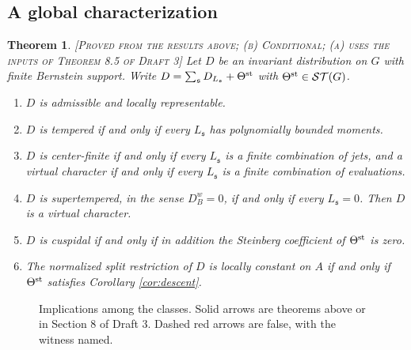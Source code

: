 \documentclass[12pt,letterpaper]{amsart}
\numberwithin{equation}{section}
\newtheorem{theorem}{Theorem}[section]
\theoremstyle{definition}
\theoremstyle{remark}
\newcommand{\St}{\mathrm{St}}
\newcommand{\triv}{\mathbf 1}
\newcommand{\ST}{\mathcal{ST}}
\newcommand{\status}[1]{\textup{[\textsc{#1}]}}
\begin{document}
\subsection{A global characterization}\label{sub:global}
\begin{theorem}\label{thm:global}\status{Proved from the results above; (b) Conditional; (a) uses the inputs of Theorem 8.5 of Draft 3}
Let $D$ be an invariant distribution on $G$ with finite Bernstein support. Write $D=\sum_{\mathfrak s}D_{L_{\mathfrak s}}+\Theta^{\rm st}$ with $\Theta^{\rm st}\in\ST(G)$.
\begin{enumerate}[label=(\alph*),leftmargin=*]
\item $D$ is admissible and locally representable.
\item $D$ is tempered if and only if every $L_{\mathfrak s}$ has polynomially bounded moments.
\item $D$ is center-finite if and only if every $L_{\mathfrak s}$ is a finite combination of jets, and a virtual character if and only if every $L_{\mathfrak s}$ is a finite combination of evaluations.
\item $D$ is supertempered, in the sense $D^w_B=0$, if and only if every $L_{\mathfrak s}=0$. Then $D$ is a virtual character.
\item $D$ is cuspidal if and only if in addition the Steinberg coefficient of $\Theta^{\rm st}$ is zero.
\item The normalized split restriction of $D$ is locally constant on $A$ if and only if $\Theta^{\rm st}$ satisfies Corollary \ref{cor:descent}.
\end{enumerate}
\end{theorem}
\begin{figure}[htbp]\centering
{}
\caption{Implications among the classes. Solid arrows are theorems above or in Section 8 of Draft 3. Dashed red arrows are false, with the witness named.}\label{fig:global}
\end{figure}
\end{document}
